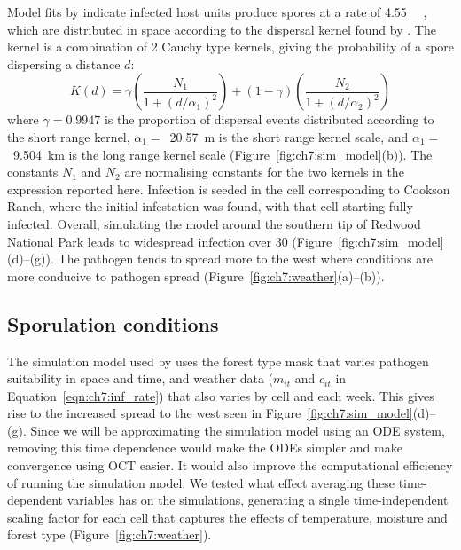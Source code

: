 Model fits by \citet{meentemeyer_epidemiological_2011} indicate infected host units produce spores at a rate of \SI{4.55}{\per\week} \citep{cunniffe_modelling_2016}, which are distributed in space according to the dispersal kernel found by \citet{meentemeyer_epidemiological_2011}. The kernel is a combination of 2 Cauchy type kernels, giving the probability of a spore dispersing a distance $d$:
\begin{equation}
    K(d) = \gamma\left(\frac{N_1}{1+(d/\alpha_1)^2}\right) + (1-\gamma)\left(\frac{N_2}{1+(d/\alpha_2)^2}\right)
\end{equation}
where $\gamma=0.9947$ is the proportion of dispersal events distributed according to the short range kernel, $\alpha_1=$~\SI{20.57}{\meter} is the short range kernel scale, and $\alpha_1=$~\SI{9.504}{\km} is the long range kernel scale (Figure~\ref{fig:ch7:sim_model}(b)). The constants $N_1$ and $N_2$ are normalising constants for the two kernels in the expression reported here. Infection is seeded in the cell corresponding to Cookson Ranch, where the initial infestation was found, with that cell starting fully infected. Overall, simulating the model around the southern tip of Redwood National Park leads to widespread infection over \SI{30}{\years} (Figure~\ref{fig:ch7:sim_model}(d)--(g)). The pathogen tends to spread more to the west where conditions are more conducive to pathogen spread (Figure~\ref{fig:ch7:weather}(a)--(b)).

\subsection{Sporulation conditions}

The simulation model used by \citet{meentemeyer_epidemiological_2011} uses the forest type mask that varies pathogen suitability in space and time, and weather data ($m_{it}$ and $c_{it}$ in Equation~\ref{eqn:ch7:inf_rate}) that also varies by cell and each week. This gives rise to the increased spread to the west seen in Figure~\ref{fig:ch7:sim_model}(d)--(g). Since we will be approximating the simulation model using an ODE system, removing this time dependence would make the ODEs simpler and make convergence using OCT easier. It would also improve the computational efficiency of running the simulation model. We tested what effect averaging these time-dependent variables has on the simulations, generating a single time-independent scaling factor for each cell that captures the effects of temperature, moisture and forest type (Figure~\ref{fig:ch7:weather}).


